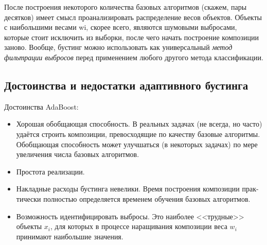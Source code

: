 \documentclass[%
	11pt,
	a4paper,
	utf8,
		]{article}
\begin{document}
После построения некоторого количества базовых алгоритмов (скажем, пары десятков) имеет смысл проанализировать распределение весов объектов. Объекты с наибольшими весами wi, скорее всего, являются шумовыми выбросами, которые стоит исключить из выборки, после чего начать построение композиции заново. Вообще, бустинг можно использовать как универсальный \emph{метод фильтрации выбросов} перед применением любого другого метода классификации.

\subsection{Достоинства и недостатки адаптивного бустинга}

Достоинства AdaBoost:
\begin{itemize}
	\item Хорошая обобщающая способность. В реальных задачах (не всегда, но часто)
	удаётся строить композиции, превосходящие по качеству базовые алгоритмы.
	Обобщающая способность может улучшаться (в некоторых задачах) по мере
	увеличения числа базовых алгоритмов.
	
	\item Простота реализации.
	
	\item Накладные расходы бустинга невелики. Время построения композиции прак-
	тически полностью определяется временем обучения базовых алгоритмов.
	
	\item Возможность идентифицировать выбросы. Это наиболее <<трудные>> объекты $ x_i $,
	для которых в процессе наращивания композиции веса $ w_i $ принимают наибольшие значения.
\end{itemize}
\end{document}
